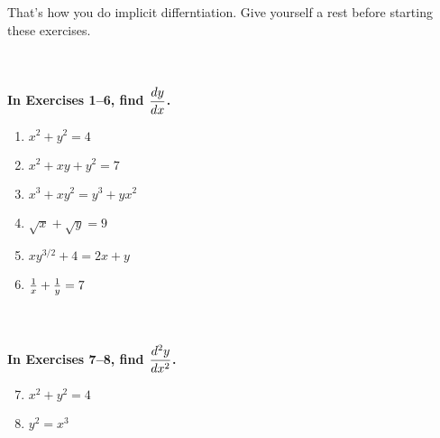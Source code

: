 That's how you do implicit differntiation. Give yourself a rest before starting these exercises.

\begin{exercise}
    ~\\\\\-\hspace{0.3cm} \textbf{
        In Exercises 1–6, find $\displaystyle\frac{dy}{dx}$.
    }\cite{mooc}
    \twocol
    \begin{enumerate} 
        \item $x^2 + y^2 = 4$
        \item $x^2+xy+y^2=7$
        \item $x^3+xy^2=y^3+yx^2$
        \item $\sqrt{x} + \sqrt{y} = 9$
        \item $xy^{3/2}+4 = 2x+y$
        \item ${1\over x} + {1\over y} = 7$
    \end{enumerate}
    \endtwocol
    ~\\\\\-\hspace{0.3cm} \textbf{
        In Exercises 7–8, find $\displaystyle\frac{d^2y}{dx^2}$.
    }\cite{ci}
    \twocol
    \begin{enumerate} 
        \setcounter{enumi}{6}
        \item $x^2+y^2=4$
        \item $y^2=x^3$
    \end{enumerate}
    \endtwocol
\end{exercise}
